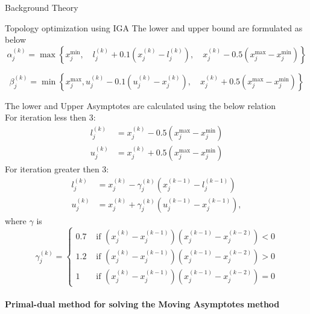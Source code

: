 \documentclass[a4paper,12pt,times]{article}
\begin{document}
\begin{section}{Background Theory}
\begin{subsection}{Topology optimization using IGA}
The lower and upper bound are formulated as below
\begin{equation}
\alpha_{j}^{(k)}=\max \left\{x_{j}^{\min }, \quad l_{j}^{(k)}+0.1\left(x_{j}^{(k)}-l_{j}^{(k)}\right), \quad x_{j}^{(k)}-0.5\left(x_{j}^{\max }-x_{j}^{\min }\right)\right\}
\end{equation}

\begin{equation}
\beta_{j}^{(k)}=\min \left\{x_{j}^{\max }, u_{j}^{(k)}-0.1\left(u_{j}^{(k)}-x_{j}^{(k)}\right), \quad x_{j}^{(k)}+0.5\left(x_{j}^{\max }-x_{j}^{\min }\right)\right\}
\end{equation}

The lower and Upper Asymptotes are calculated using the below relation \\
For iteration less then 3:
\begin{equation}
\begin{aligned}
l_{j}^{(k)} &=x_{j}^{(k)}-0.5\left(x_{j}^{\max }-x_{j}^{\min }\right) \\
u_{j}^{(k)} &=x_{j}^{(k)}+0.5\left(x_{j}^{\max }-x_{j}^{\min }\right)
\end{aligned}
\end{equation}
For iteration greater then 3:
\begin{equation}
\begin{aligned}
l_{j}^{(k)} &=x_{j}^{(k)}-\gamma_{j}^{(k)}\left(x_{j}^{(k-1)}-l_{j}^{(k-1)}\right) \\
u_{j}^{(k)} &=x_{j}^{(k)}+\gamma_{j}^{(k)}\left(u_{j}^{(k-1)}-x_{j}^{(k-1)}\right),
\end{aligned}
\end{equation}
where $\gamma$ is 
\begin{equation}
\gamma_{j}^{(k)}=\left\{\begin{array}{cl}
0.7 & \text { if }\left(x_{j}^{(k)}-x_{j}^{(k-1)}\right)\left(x_{j}^{(k-1)}-x_{j}^{(k-2)}\right)<0 \\
1.2 & \text { if }\left(x_{j}^{(k)}-x_{j}^{(k-1)}\right)\left(x_{j}^{(k-1)}-x_{j}^{(k-2)}\right)>0 \\
1 & \text { if }\left(x_{j}^{(k)}-x_{j}^{(k-1)}\right)\left(x_{j}^{(k-1)}-x_{j}^{(k-2)}\right)=0
\end{array}\right.
\end{equation}\\
\textbf{ Primal-dual method for solving the Moving Asymptotes method}\\


\end{subsection}
\end{section}
\end{document}
